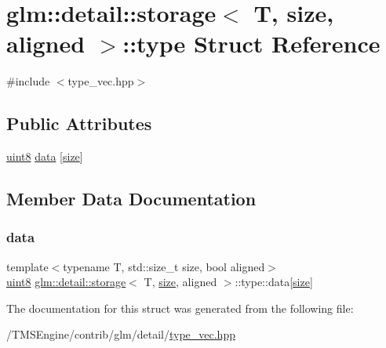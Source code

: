 \hypertarget{structglm_1_1detail_1_1storage_1_1type}{}\section{glm\+:\+:detail\+:\+:storage$<$ T, size, aligned $>$\+:\+:type Struct Reference}
\label{structglm_1_1detail_1_1storage_1_1type}


{\ttfamily \#include $<$type\+\_\+vec.\+hpp$>$}

\subsection*{Public Attributes}
\begin{DoxyCompactItemize}
\item 
\hyperlink{namespaceglm_1_1detail_aef2588f97d090cc19fbbe0c74fe17c8f}{uint8} \hyperlink{structglm_1_1detail_1_1storage_1_1type_ab44756dae5eb9194e4e941c91ce9f257}{data} \mbox{[}\hyperlink{_s_d_l__opengl__glext_8h_a3d1e3edfcf61ca2d831883e1afbad89e}{size}\mbox{]}
\end{DoxyCompactItemize}


\subsection{Member Data Documentation}
\mbox{\label{structglm_1_1detail_1_1storage_1_1type_ab44756dae5eb9194e4e941c91ce9f257}} 
\subsubsection{\texorpdfstring{data}{data}}
{\footnotesize\ttfamily template$<$typename T, std\+::size\+\_\+t size, bool aligned$>$ \\
\hyperlink{namespaceglm_1_1detail_aef2588f97d090cc19fbbe0c74fe17c8f}{uint8} \hyperlink{structglm_1_1detail_1_1storage}{glm\+::detail\+::storage}$<$ T, \hyperlink{_s_d_l__opengl__glext_8h_a3d1e3edfcf61ca2d831883e1afbad89e}{size}, aligned $>$\+::type\+::data\mbox{[}\hyperlink{_s_d_l__opengl__glext_8h_a3d1e3edfcf61ca2d831883e1afbad89e}{size}\mbox{]}}



The documentation for this struct was generated from the following file\+:\begin{DoxyCompactItemize}
\item 
/\+T\+M\+S\+Engine/contrib/glm/detail/\hyperlink{type__vec_8hpp}{type\+\_\+vec.\+hpp}\end{DoxyCompactItemize}
